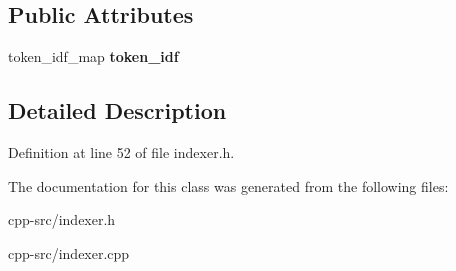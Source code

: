 \subsection*{Public Attributes}
\begin{DoxyCompactItemize}
\item 
\hypertarget{classasferindexer_aaadbcd1fe7c3f09bacc00650a502ae33}{token\-\_\-idf\-\_\-map {\bfseries token\-\_\-idf}}\label{classasferindexer_aaadbcd1fe7c3f09bacc00650a502ae33}

\end{DoxyCompactItemize}


\subsection{Detailed Description}


Definition at line 52 of file indexer.\-h.



The documentation for this class was generated from the following files\-:\begin{DoxyCompactItemize}
\item 
cpp-\/src/indexer.\-h\item 
cpp-\/src/indexer.\-cpp\end{DoxyCompactItemize}
